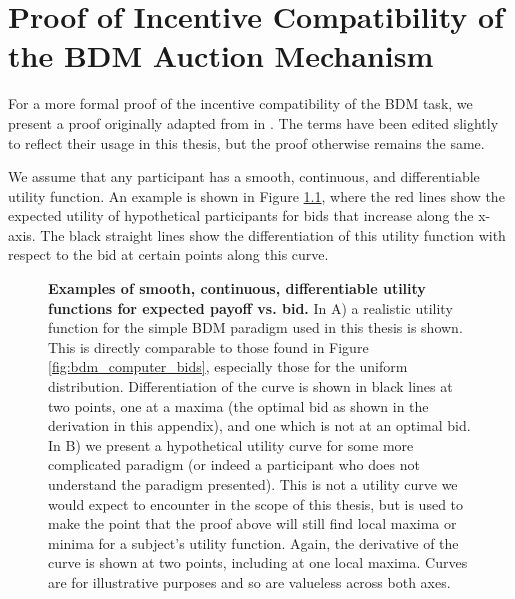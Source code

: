 
\chapter{Proof of Incentive Compatibility of the BDM Auction Mechanism}

\ifpdf
    \graphicspath{{Appendix2.1/Figs/Raster/}{Appendix2.1/Figs/PDF/}{Appendix1/Figs/}}
\else
    \graphicspath{{Appendix2.1/Figs/Vector/}{Appendix2.1/Figs/}}
\fi


For a more formal proof of the incentive compatibility of the BDM task, we present a proof originally adapted from \cite{milgromTheoryAuctionsCompetitive1982} in \cite{almohammadRewardValueRevealed2022}. The terms have been edited slightly to reflect their usage in this thesis, but the proof otherwise remains the same.

We assume that any participant has a smooth, continuous, and differentiable utility function. An example is shown in Figure \ref{fig:utility_functions}, where the red lines show the expected utility of hypothetical participants for bids that increase along the x-axis. The black straight lines show the differentiation of this utility function with respect to the bid at certain points along this curve. 

\begin{figure}[p] 
\centering    

\caption[Examples of smooth, continuous, differentiable utility functions for expected payoff vs. bid.]{\textbf{Examples of smooth, continuous, differentiable utility functions for expected payoff vs. bid.} In A) a realistic utility function for the simple BDM paradigm used in this thesis is shown. This is directly comparable to those found in Figure \ref{fig:bdm_computer_bids}, especially those for the uniform distribution. Differentiation of the curve is shown in black lines at two points, one at a maxima (the optimal bid as shown in the derivation in this appendix), and one which is not at an optimal bid. In B) we present a hypothetical utility curve for some more complicated paradigm (or indeed a participant who does not understand the paradigm presented). This is not a utility curve we would expect to encounter in the scope of this thesis, but is used to make the point that the proof above will still find local maxima or minima for a subject's utility function. Again, the derivative of the curve is shown at two points, including at one local maxima. Curves are for illustrative purposes and so are valueless across both axes.}
\label{fig:utility_functions}
\end{figure}

